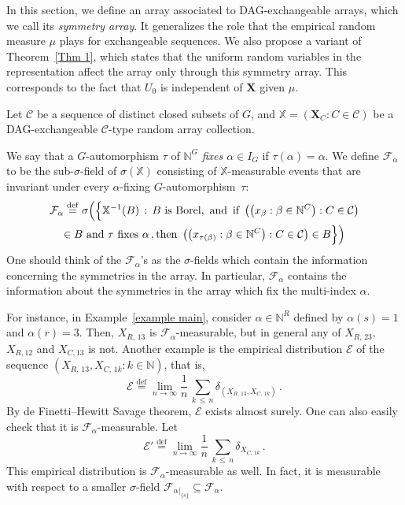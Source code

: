 \documentclass[10pt]{amsart}
\theoremstyle{definition}\newtheorem{defi}[theo]{Definition}\newtheorem{rema}[theo]{Remark}\newtheorem{exam}[theo]{Example}\newtheorem{exem}[theo]{Example}\newtheorem{nota}[theo]{Notation}
\newcommand{\alf}{\alpha}%
\newcommand*\bb{\beta}
\newcommand*{\defeq}{\stackrel{\mathrm{def}}{=}}
\newcommand{\indices}[1]{\mathbb{N}^{#1}}
\newcommand*\X{\mathbb{X}}
\newcommand*\N{\mathbb{N}}
\newcommand*\CC{{\mathcal{C}}}
\newcommand*\EE{{\mathcal{E}}}
\newcommand*\FF{\mathcal{F}}
\newcommand*\bX{\mathbf{X}}
\begin{document}
In this section, we define an array associated to DAG-exchangeable arrays, which we call its \emph{symmetry array}. It generalizes the role that the empirical random measure $\mu$ plays for exchangeable sequences. We also propose a variant of Theorem~\ref{Thm 1}, which states that the uniform random variables in the representation affect the array only through this symmetry array. This corresponds to the fact that $U_0$ is independent of $\bX$ given $\mu$.

Let $\CC$ be a sequence of distinct closed subsets of $G$, and $\X=(\bX_C : C \in \CC)$ be a DAG-exchangeable $\CC$-type random array collection.

We say that a $G$-automorphism $\tau$ of $\indices G$ \emph{fixes $\alf\in I_G$} if $\tau(\alf)=\alf$. We define $\mathcal{F}_\alf$ to be the sub-$\sigma$-field of $\sigma(\X)$ consisting of $\X$-measurable events that are invariant under every $\alf$-fixing $G$-automorphism~$\tau$:
\begin{multline}\label{def:F_alpha}
\mathcal{F}_\alf
\defeq \sigma\Big(\Big\{\X^{-1}(B)\,:\,B \text{ is Borel,\, and\, }
\text{if } \left(\left(x_\bb : \bb\in\indices C\right) : C \in \CC\right) \\
\in B \text{ and }\tau \text{ fixes }\alf\,,
\text{then } \left(\left(x_{\tau(\bb)} : \bb \in \indices C\right) : C \in \CC\right) \in B\Big\}\Big)
\end{multline}
One should think of the $\FF_\alf$'s as the $\sigma$-fields which contain the information concerning the symmetries in the array. In particular, $\FF_\alf$ contains the information about the symmetries in the array which fix the multi-index $\alf$.

For instance, in Example~\ref{example main}, consider $\alpha \in \N^R$ defined by $\alpha(s)=1$ and $\alpha(r)=3$. Then, $X_{R,\,13}$ is $\FF_\alpha$-measurable, but in general any of $X_{R,\,23}$, $X_{R,12}$ and $X_{C,13}$ is not. Another example is the empirical distribution $\EE$ of the sequence $(X_{R,\,13}, X_{C,\,1k} : k \in \N)$, that is,
\[
\EE
\defeq \lim_{n \to \infty} \frac{1}{n}\, \underset{k\, \leq\,n}{\sum} \delta_{(X_{R,\,13},X_{C,\,1k})}\,.
\]
By de Finetti--Hewitt Savage theorem, $\EE$ exists almost surely. One can also easily check that it is $\FF_\alf$-measurable. Let
\[
\EE'
\defeq \lim_{n \to \infty} \frac{1}{n}\, \underset{k \,\leq\,n}{\sum} \delta_{X_{C,\,1k}}\,.
\]
This empirical distribution is $\FF_\alf$-measurable as well. In fact, it is measurable with respect to a smaller $\sigma$-field $\FF_{\alf|_{\{s\}}} \subseteq \FF_\alf$.
\end{document}
